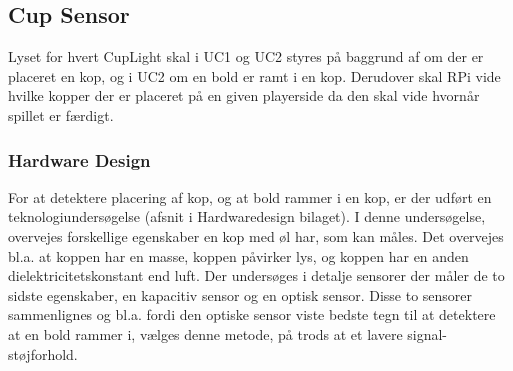 \documentclass[Rapport/Rapport_main.tex]{subfiles}
\begin{document}
\subsection{Cup Sensor}
Lyset for hvert CupLight skal i UC1 og UC2 styres på baggrund af om der er placeret en kop, og i UC2 om en bold er ramt i en kop. Derudover skal RPi vide hvilke kopper der er placeret på en given playerside da den skal vide hvornår spillet er færdigt.
\subsubsection{Hardware Design}
For at detektere placering af kop, og at bold rammer i en kop, er der udført en teknologiundersøgelse (afsnit  i Hardwaredesign bilaget). I denne undersøgelse, overvejes forskellige egenskaber en kop med øl har, som kan måles. Det overvejes bl.a. at koppen har en masse, koppen påvirker lys, og koppen har en anden dielektricitetskonstant end luft. Der undersøges i detalje sensorer der måler de to sidste egenskaber, en kapacitiv sensor og en optisk sensor. Disse to sensorer sammenlignes og bl.a. fordi den optiske sensor viste bedste tegn til at detektere at en bold rammer i, vælges denne metode, på trods at et lavere signal-støjforhold.
\end{document}
